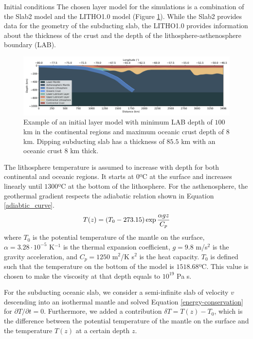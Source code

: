\documentclass[final]{beamer}
\newlength{\colwidth}
\begin{document}
\begin{frame}[t]
\begin{columns}[t]
\begin{column}{\colwidth}
\begin{block}{Initial conditions}
    \heading{\textcolor{darkblue}{Layer model}}
      The chosen layer model for the simulations is a combination of the Slab2 model \cite{hayes2018slab2} and the LITHO1.0 model \cite{pasyanos2014litho1} (Figure \ref{fig:interfaces}). While the Slab2 provides data for the geometry of the subducting slab, the LITHO1.0 provides information about the thickness of the crust and the depth of the lithosphere-asthenosphere boundary (LAB). 
      \begin{figure}
        \centering
        \includegraphics[width=0.3\paperwidth]{figures/interfaces.png}
        \caption{Example of an initial layer model with minimum LAB depth of $100$ km in the continental regions and maximum oceanic crust depth of $8$ km. Dipping subducting slab has a thickness of $85.5$ km with an oceanic crust $8$ km thick.}
        \label{fig:interfaces}
      \end{figure}
    \heading{\textcolor{darkblue}{Thermal structure}}
      The lithosphere temperature is assumed to increase with depth for both continental and oceanic regions. It starts at $0$ºC at the surface and increases linearly until $1300$ºC at the bottom of the lithosphere. For the asthenosphere, the geothermal gradient respects the adiabatic relation shown in Equation \ref{adiabtic_curve}.
      \begin{equation}{\label{adiabtic_curve}}
        T(z)=(T_0-273.15)\exp{\frac{\alpha g z}{C_p}}
      \end{equation}
      \noindent where $T_0$ is the potential temperature of the mantle on the surface, $\alpha=3.28\cdot 10^{-5}$ K$^{-1}$ is the thermal expansion coefficient, $g=9.8$ m/s$^2$ is the gravity acceleration, and $C_p=1250$ m$^2$/K s$^2$ is the heat capacity. $T_0$ is defined such that the temperature on the bottom of the model is $1518.68$ºC. This value is chosen to make the viscosity at that depth equals to $10^{19}$ Pa s.
    
      For the subducting oceanic slab, we consider a semi-infinite slab of velocity $v$ descending into an isothermal mantle and solved Equation \ref{energy-conservation} for $\partial T/\partial t=0$. Furthermore, we added a contribution $\delta T = T(z)-T_0$, which is the difference between the potential temperature of the mantle on the surface and the temperature $T(z)$ at a certain depth $z$.
   

\end{block}
\end{column}
\end{columns}
\end{frame}
\end{document}

